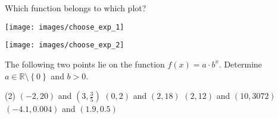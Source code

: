 \begin{exercise}
	Which function belongs to which plot?\\[10pt]
	\begin{minipage}{0.48\textwidth}
		\centering
		\texttt{[image: images/choose\_exp\_1]}
	\end{minipage}
	\begin{minipage}{0.48\textwidth}
		\centering
		\texttt{[image: images/choose\_exp\_2]}
	\end{minipage}
\end{exercise}
\begin{exercise}
	The following two points lie on the function $f\left(x\right)=a\cdot b^x$.
	Determine $a\in\mathbb R\setminus\left\{0\right\}$ and $b>0$.
	\begin{tasks}(2)
		\task $\left(-2,20\right)$ and $\left(3,\frac{3}{5}\right)$
		\task $\left(0,2\right)$ and $\left(2,18\right)$
		\task $\left(2,12\right)$ and $\left(10,3072\right)$
		\task $\left(-4.1,0.004\right)$ and $\left(1.9,0.5\right)$
	\end{tasks}
\end{exercise}
